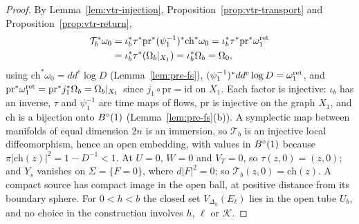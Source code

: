 \begin{proof}
By Lemma~\ref{lem:vtr-injection}, Proposition~\ref{prop:vtr-transport} and Proposition~\ref{prop:vtr-return},
\begin{align*}
 \mathcal T_b^*\omega_0&=\iota_b^*\tau^*\mathrm{pr}^*(\psi_1^{-1})^*\mathrm{ch}^*\omega_0
 =\iota_b^*\tau^*\mathrm{pr}^*\omega^{\rm ret}_1\\
 &=\iota_b^*\tau^*(\Omega_b|_{X_1})=\iota_b^*\Omega_b=\Omega_0 ,
\end{align*}
using $\mathrm{ch}^*\omega_0=dd^c\log D$ (Lemma~\ref{lem:pre-fs}),
$(\psi_1^{-1})^*dd^c\log D=\omega^{\rm ret}_1$, and $\mathrm{pr}^*\omega^{\rm ret}_1=\mathrm{pr}^*j_1^*\Omega_b=\Omega_b|_{X_1}$ since
$j_1\circ\mathrm{pr}=\mathrm{id}$ on $X_1$. Each factor is injective: $\iota_b$ has an inverse, $\tau$ and $\psi_1^{-1}$ are time maps of flows,
$\mathrm{pr}$ is injective on the graph $X_1$, and $\mathrm{ch}$ is a bijection onto $B^{\circ}(1)$ (Lemma~\ref{lem:pre-fs}(b)). A
symplectic map between manifolds of equal dimension $2n$ is an immersion, so $\mathcal T_b$ is an injective local
diffeomorphism, hence an open embedding, with values in $B^{\circ}(1)$ because $\pi|\mathrm{ch}(z)|^2=1-D^{-1}<1$. At $U=0$, $W=0$ and
$V_T=0$, so $\tau(z,0)=(z,0)$; and $Y_s$ vanishes on $\Sigma=\{F=0\}$, where $d|F|^2=0$; so $\mathcal T_b(z,0)=\mathrm{ch}(z)$. A compact
source has compact image in the open ball, at positive distance from its boundary sphere. For $0<h<b$ the closed set
$V_{\Delta_h}(E_\ell)$ lies in the open tube $U_b$, and no choice in the construction involves $h$, $\ell$ or $\mathcal K$.
\end{proof}
